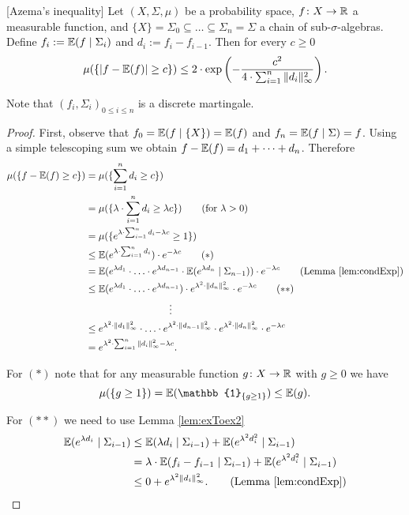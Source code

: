 \begin{lemma}\label{lem:azema}[Azema's inequality]
Let $(X,\Sigma,\mu)$ be a probability space, $f\colon X\to\mathbb{R}$ a measurable function, and $\{X\}=\Sigma_0\subseteq\dots\subseteq\Sigma_n=\Sigma$ a chain of sub-$\sigma$-algebras. Define $f_i:=\mathbb{E}(f\mid\Sigma_i)$ and $d_i:=f_i-f_{i-1}$. Then for every $c\geq0$
\[\mu(\{|f-\mathbb{E}(f)|\geq c\})\leq 2\cdot\exp\left(-\frac{c^2}{4\cdot\sum_{i=1}^{n}\|d_i\|^2_\infty}\right).\]
\end{lemma}
Note that $(f_i,\Sigma_i)_{0\leq i\leq n}$ is a discrete martingale. 
\begin{proof} First, observe that $f_0=\mathbb{E}(f\mid \{X\})=\mathbb{E}(f)$ and $f_n=\mathbb{E}(f\mid\Sigma)=f$. Using a simple telescoping sum we obtain $f-\mathbb{E}(f)=d_1+\dots+d_n$. Therefore
\begin{align*}
\mu(\{f-\E(f)\geq c\})&=\mu(\{\sum_{i=1}^{n}d_i\geq  c\})\\
&=\mu(\{\lambda\cdot\sum_{i=1}^{n}d_i\geq \lambda c\})\tag{for $\lambda>0$}\\
&=\mu(\{e^{\lambda\cdot\sum_{i=1}^{n}d_i-\lambda c}\geq 1\})\\
&\leq\E(e^{\lambda\cdot\sum_{i=1}^{n}d_i})\cdot e^{-\lambda c}\tag{$\ast$}\\
&=\E(e^{\lambda d_1}\cdot\ldots\cdot e^{\lambda d_{n-1}}\cdot\E(e^{\lambda d_n}\mid \Sigma_{n-1}))\cdot e^{-\lambda c}\tag{Lemma \ref{lem:condExp}}\\
&\leq\E(e^{\lambda d_1}\cdot\ldots\cdot e^{\lambda d_{n-1}})\cdot e^{\lambda^2\cdot \|d_n\|^2_\infty}\cdot e^{-\lambda c}\tag{$\ast\ast$}\\
&\hspace{3cm}\vdots\\
&\leq e^{\lambda^2\cdot \|d_1\|^2_\infty}\cdot\ldots\cdot e^{\lambda^2\cdot \|d_{n-1}\|^2_\infty}\cdot e^{\lambda^2\cdot \|d_n\|^2_\infty}\cdot e^{-\lambda c}\\
&=e^{\lambda^2\cdot\sum_{i=1}^n\|d_i\|^2_\infty-\lambda c}.
\end{align*}

For $(\ast)$ note that for any measurable function $g\colon X\to\mathbb{R}$ with $g\geq0$ we have %
\[\mu(\{g\geq1\})=\E(\mathbb{1}_{\{g\geq1\}})\leq\E(g).\]

For $(\ast\ast)$ we need to use Lemma \ref{lem:exToex2}
\begin{align*}
\E(e^{\lambda d_i}\mid \Sigma_{i-1})&\leq \E(\lambda d_i\mid\Sigma_{i-1})+\E(e^{\lambda^2 d^2_i}\mid\Sigma_{i-1})\\
&=\lambda\cdot\E( f_i-f_{i-1}\mid\Sigma_{i-1}) + \E(e^{\lambda^2 d^2_i}\mid\Sigma_{i-1})\\
&\leq 0 + e^{\lambda^2 \|d_i\|_\infty^2}.\tag{Lemma \ref{lem:condExp}}
\end{align*}


\end{proof}
